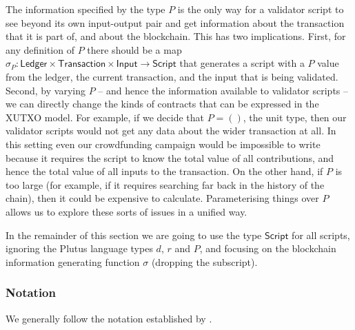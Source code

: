 \documentclass[a4paper]{article}
\theoremstyle{definition}  %
\begin{document}
The information specified by the type $P$ is the only way for a
validator script to see beyond its own input-output pair and get
information about the transaction that it is part of, and about the
blockchain. This has two implications. First, for any definition of
$P$ there should be a map $\sigma_P : \mathsf{Ledger} \times
\mathsf{Transaction} \times \mathsf{Input} \rightarrow
\mathsf{Script}$ that generates a script with a $P$ value from the
ledger, the current transaction, and the input that is being
validated. Second, by varying $P$ -- and hence the information
available to validator scripts -- we can directly change the kinds of
contracts that can be expressed in the XUTXO model. For example, if we
decide that $P = ()$, the unit type, then our validator scripts would
not get any data about the wider transaction at all. In this setting
even our crowdfunding campaign would be impossible to write because it
requires the script to know the total value of all contributions, and
hence the total value of all inputs to the transaction.  On the other
hand, if $P$ is too large (for example, if it requires searching far
back in the history of the chain), then it could be expensive to
calculate.  Parameterising things over $P$ allows us to explore these
sorts of issues in a unified way.

In the remainder of this section we are going to use the type
$\mathsf{Script}$ for all scripts, ignoring the Plutus language types
$d$, $r$ and $P$, and focusing on the blockchain information
generating function $\sigma$ (dropping the subscript).

\subsubsection{Notation}
We generally follow the notation established by
\cite{Zahnentferner18-UTxO}.
\end{document}
